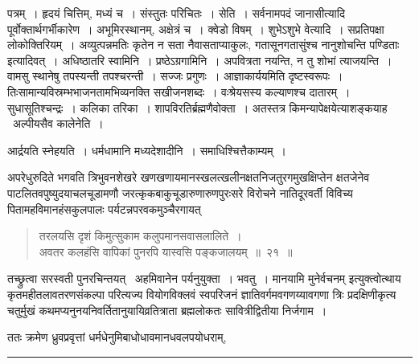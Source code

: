 \documentclass[11pt, openany]{book}
\begin{document}
\noindent
{\s पत्रम्~। हृदयं चित्तिम्, मध्यं च~। संस्तुतः परिचितः~। {\qtt सेति}~। सर्वनामपदं जानासीत्यादि पूर्वोक्तार्थगर्भीकारेण~। अभूमिरस्थानम्, अक्षेत्रं च~। क्वेडो विषम्~। {\qtt शुभेऽशुभे वेत्यादि}~। सप्रतिपक्षा लोकोक्तिरियम्~। {\qt अव्युत्पन्नमतिः कृतेन न सता नैवासताप्याकुलः}, {\qt गतासूनगतासुंश्च नानुशोचन्ति पण्डिताः} इत्यादिवत्~। अधिष्ठातरि स्वामिनि~। प्रष्ठेऽग्रगामिनि~। अपवित्रता नयन्ति, न तु शोभां त्याजयन्ति~। वामसु स्थानेषु तपस्यन्ती तपश्चरन्ती~। सज्जः प्रगुणः~। आज्ञाकार्ययमिति दृष्टस्वरूपः~। तिःसामान्यविस्रम्भभाजनतामभिव्यनक्ति सखीजनशब्दः~। वःश्रेयसस्य कल्याणश्च दातारम्~। सुधासूतिश्चन्द्रः~। कलिका तरिका~। शापविरतिर्ब्रह्मणैवोक्ता~। अतस्तत्र किमन्यापेक्षयेत्याशङ्कयाह \textendash\ {\qtt अल्पीयसैव कालेनेति}~।

आर्द्रयति स्नेहयति~। धर्मधामानि मध्यदेशादीनि~। समाधिश्चित्तैकाम्यम्~।}

\newpage

अपरेधुरुदिते भगवति त्रिभुवनशेखरे खणखणायमानस्खलत्खलीनक्षतनिजतुरगमुखक्षिप्तेन क्षतजेनेव पाटलितवपुष्युदयाचलचूडामणौ जरत्कृकबाकुचूडारुणारुणपुरःसरे विरोचने नातिदूरवर्ती विविच्य पितामहविमानहंसकुलपालः पर्यटन्नपरवकमुञ्चैरगायत् \textendash\ 

\vspace{-2mm}
\begin{quote}
{\ha तरलयसि दृशं किमुत्सुकाम कलुपमानसवासलालिते~।\\
अवतर कलहंसि वापिकां पुनरपि यास्वसि पङ्कजालयम्~॥~२१~॥}
\end{quote}

\vspace{-2mm}
तच्छ्रुत्वा सरस्वती पुनरचिन्तयत् \textendash\ {\haq अहमिवानेन पर्यनुयुक्ता~। भवतु~। मानयामि मुनेर्वचनम्} इत्युक्त्वोत्थाय कृतमहीतलावतरणसंकल्पा परित्यज्य वियोगविक्लवं स्वपरिजनं ज्ञातिवर्गमवगणय्यावगणा त्रिः प्रदक्षिणीकृत्य चतुर्मुखं कथमप्यनुनयनिवर्तितानुयायिव्रतित्राता ब्रह्मलोकतः सावित्रीद्वितीया निर्जगाम~।

ततः क्रमेण ध्रुवप्रवृत्तां धर्मधेनुमिबाधोधावमानधवलपयोधराम्,

\vspace{2mm}
\hrule
\end{document}
